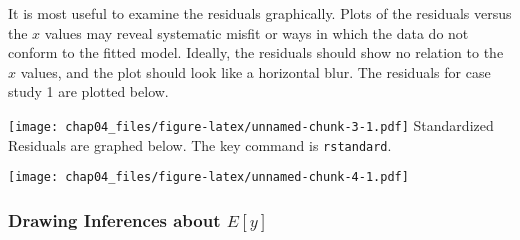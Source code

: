 \documentclass[]{article}
\newenvironment{Shaded}{\begin{snugshade}}{\end{snugshade}}
\newcommand{\DataTypeTok}[1]{\textcolor[rgb]{0.13,0.29,0.53}{#1}}
\newcommand{\DecValTok}[1]{\textcolor[rgb]{0.00,0.00,0.81}{#1}}
\newcommand{\KeywordTok}[1]{\textcolor[rgb]{0.13,0.29,0.53}{\textbf{#1}}}
\newcommand{\NormalTok}[1]{#1}
\newcommand{\OperatorTok}[1]{\textcolor[rgb]{0.81,0.36,0.00}{\textbf{#1}}}
\newcommand{\StringTok}[1]{\textcolor[rgb]{0.31,0.60,0.02}{#1}}
\begin{document}
It is most useful to examine the residuals graphically. Plots of the
residuals versus the \(x\) values may reveal systematic misfit or ways
in which the data do not conform to the fitted model. Ideally, the
residuals should show no relation to the \(x\) values, and the plot
should look like a horizontal blur. The residuals for case study 1 are
plotted below.

\begin{Shaded}
\end{Shaded}

\texttt{[image: chap04\_files/figure-latex/unnamed-chunk-3-1.pdf]}
Standardized Residuals are graphed below. The key command is
\texttt{rstandard}.

\begin{Shaded}
\end{Shaded}

\texttt{[image: chap04\_files/figure-latex/unnamed-chunk-4-1.pdf]}

\hypertarget{drawing-inferences-about-ey}{%
\subsubsection{\texorpdfstring{Drawing Inferences about
\(E[y]\)}{Drawing Inferences about E{[}y{]}}}\label{drawing-inferences-about-ey}}
\end{document}
